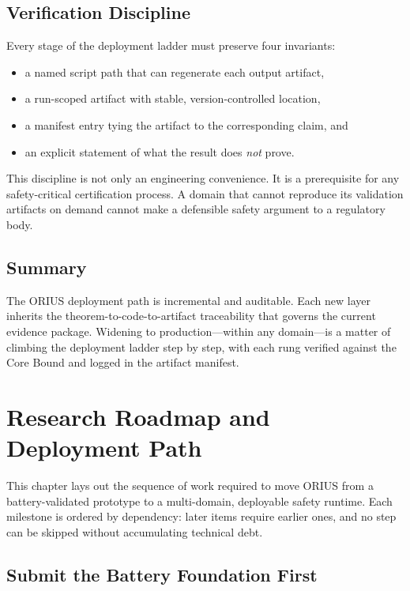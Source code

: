 \subsection{Verification Discipline}

Every stage of the deployment ladder must preserve four invariants:

\begin{itemize}
  \item a named script path that can regenerate each output artifact,
  \item a run-scoped artifact with stable, version-controlled location,
  \item a manifest entry tying the artifact to the corresponding claim, and
  \item an explicit statement of what the result does \emph{not} prove.
\end{itemize}

This discipline is not only an engineering convenience.  It is a
prerequisite for any safety-critical certification process.  A domain
that cannot reproduce its validation artifacts on demand cannot make a
defensible safety argument to a regulatory body.

\subsection{Summary}

The ORIUS deployment path is incremental and auditable.  Each new layer
inherits the theorem-to-code-to-artifact traceability that governs the
current evidence package.  Widening to production---within any domain---is
a matter of climbing the deployment ladder step by step, with each rung
verified against the Core Bound and logged in the artifact manifest.



\section{Research Roadmap and Deployment Path}
\label{ch:roadmap}

This chapter lays out the sequence of work required to move ORIUS from a
battery-validated prototype to a multi-domain, deployable safety runtime.
Each milestone is ordered by dependency: later items require earlier ones,
and no step can be skipped without accumulating technical debt.

\subsection{Submit the Battery Foundation First}

